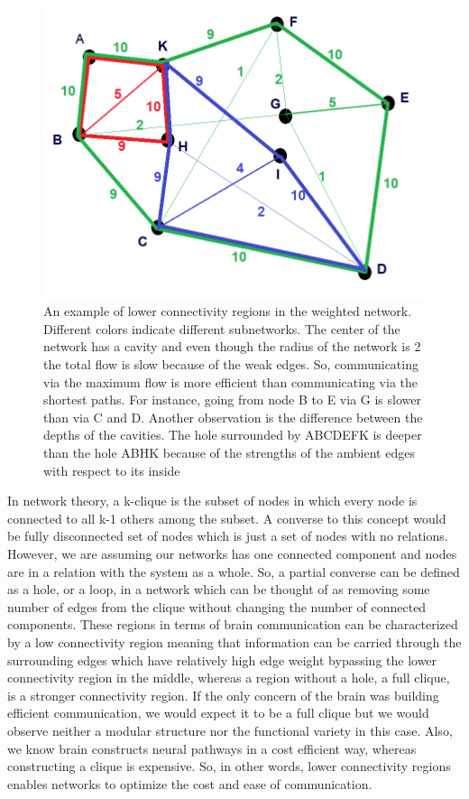 \documentclass[9pt,twocolumn,twoside,lineno]{pnas-new}
\begin{document}
\begin{figure}%
\centering
\includegraphics[width=.8\linewidth]{lowwerconnectivity.png}
\caption{An example of lower connectivity regions in the weighted network. Different colors indicate different subnetworks. The center of the network has a cavity and even though the radius of the network is 2 the total flow is slow because of the weak edges. So, communicating via the maximum flow is more efficient than communicating via the shortest paths. For instance, going from node B to E via G is slower than via C and D. Another observation is the difference between the depths of the cavities. The hole surrounded by ABCDEFK is deeper than the hole ABHK because of the strengths of the ambient edges with respect to its inside}
\label{fig:connectivty}
\end{figure}



  In network theory, a k-clique is the subset of nodes in which every node is connected to all k-1 others among the subset. A converse to this concept would be fully disconnected set of nodes which is just a set of nodes with no relations. However, we are assuming our networks has one connected component and nodes are in a relation with the system as a whole. So, a partial converse can be defined as a hole, or a loop, in a network which can be thought of as removing some number of edges from the clique without changing the number of connected components. These regions in terms of brain communication can be characterized by a low connectivity region meaning that information can be carried through the surrounding edges which have relatively high edge weight bypassing the lower connectivity region in the middle, whereas a region without a hole, a full clique, is a stronger connectivity region. If the only concern of the brain was building efficient communication, we would expect it to be a full clique but we would observe neither a modular structure nor the functional variety in this case. Also, we know brain constructs neural pathways in a cost efficient way\cite{costeffic,costeffic1}, whereas constructing a clique is expensive. So, in other words, lower connectivity regions enables networks to optimize the cost and ease of communication.
\end{document}
